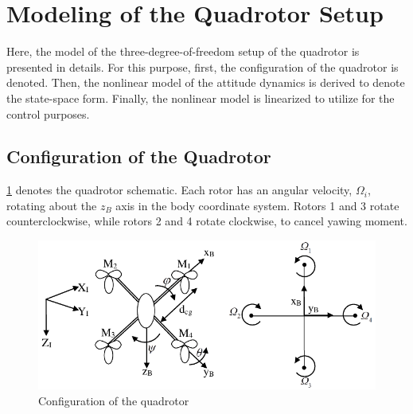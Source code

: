 \documentclass[conference]{IEEEtran}
\begin{document}
\section{Modeling of the Quadrotor  Setup}\label{sec:modeling}
\noindent Here, the model of the three-degree-of-freedom setup of the quadrotor is presented in details.
For this purpose, first, the configuration of the quadrotor is denoted. Then, the nonlinear model of the attitude dynamics is derived to denote the state-space form. Finally, the nonlinear model is linearized to utilize for the control purposes.
\subsection{Configuration of the Quadrotor}
\noindent  \figurename{\ref{QuadAssum}} denotes the quadrotor schematic.
Each rotor has an angular velocity, $\Omega_i$, rotating about the $z_B$ axis in the body coordinate system.
Rotors 1 and 3 rotate counterclockwise, while rotors 2 and 4 rotate clockwise, to cancel yawing moment.
\vspace{-0.5cm}
\begin{figure}[!h]
	\includegraphics[width=\linewidth]{../Figures/introduction/fig17.pdf}
	\centering
	\caption{Configuration of the quadrotor}
	\label{QuadAssum}
\end{figure}
\end{document}
